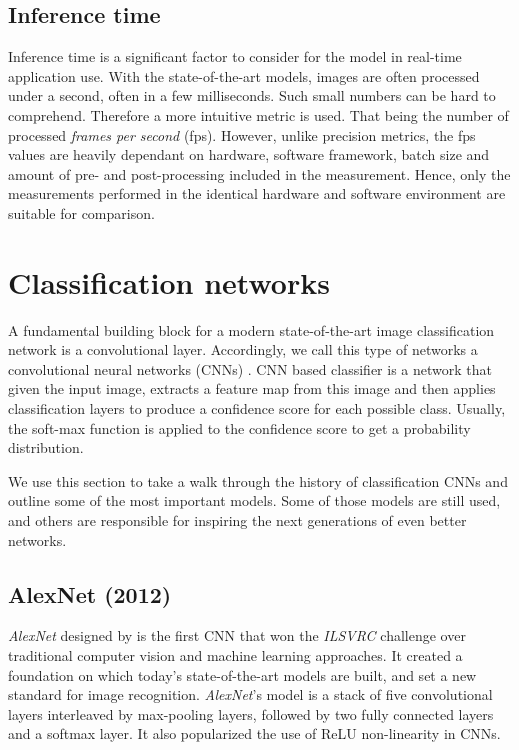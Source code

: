 \subsection{Inference time}
Inference time is a significant factor to consider for the model in real-time application use. With the state-of-the-art models, images are often processed under a second, often in a few milliseconds. Such small numbers can be hard to comprehend. Therefore a more intuitive metric is used. That being the number of processed \textit{frames per second} (fps). However, unlike precision metrics, the fps values are heavily dependant on hardware, software framework, batch size and amount of pre- and post-processing included in the measurement. Hence, only the measurements performed in the identical hardware and software environment are suitable for comparison.

\section{Classification networks}
\label{sec:clsnets}
A fundamental building block for a modern state-of-the-art image classification network is a convolutional layer. Accordingly, we call this type of networks a convolutional neural networks (CNNs) \cite[ch.~9]{bib:dlbook}. CNN based classifier is a network that given the input image, extracts a feature map from this image and then applies classification layers to produce a confidence score for each possible class. Usually, the soft-max function is applied to the confidence score to get a probability distribution.

We use this section to take a walk through the history of classification CNNs and outline some of the most important models. Some of those models are still used, and others are responsible for inspiring the next generations of even better networks.

\subsection{AlexNet (2012)}
\textit{AlexNet} designed by \citeauthor{bib:alexnet} \cite{bib:alexnet} is the first CNN that won the \textit{ILSVRC} challenge over traditional computer vision and machine learning approaches. It created a foundation on which today's state-of-the-art models are built, and set a new standard for image recognition. \textit{AlexNet}'s model is a stack of five convolutional layers interleaved by max-pooling layers, followed by two fully connected layers and a softmax layer. It also popularized the use of ReLU non-linearity in CNNs.

